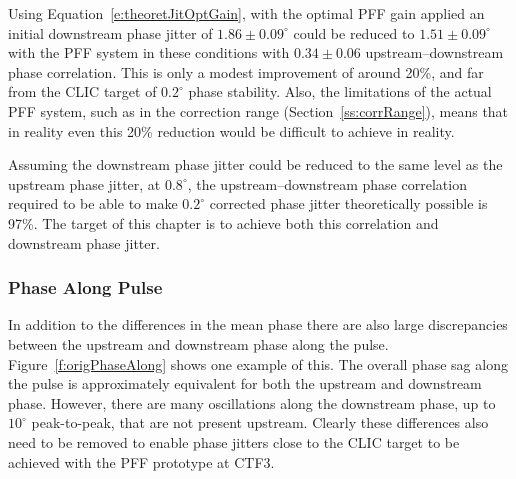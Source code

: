 Using Equation~\ref{e:theoretJitOptGain}, with the optimal PFF gain applied an initial downstream phase jitter of \(1.86\pm0.09^\circ\) could be reduced to \(1.51\pm0.09^\circ\) with the PFF system in these conditions with \(0.34\pm0.06\) upstream--downstream phase correlation. This is only a modest improvement of around 20\%, and far from the CLIC target of \(0.2^\circ\) phase stability. Also, the limitations of the actual PFF system, such as in the correction range (Section~\ref{ss:corrRange}), means that in reality even this 20\% reduction would be difficult to achieve in reality.

Assuming the downstream phase jitter could be reduced to the same level as the upstream phase jitter, at \(0.8^\circ\), the upstream--downstream phase correlation required to be able to make \(0.2^\circ\) corrected phase jitter theoretically possible is 97\%. The target of this chapter is to achieve both this correlation and downstream phase jitter.

\subsubsection{Phase Along Pulse}

In addition to the differences in the mean phase there are also large discrepancies between the upstream and downstream phase along the pulse. Figure~\ref{f:origPhaseAlong} shows one example of this. The overall phase sag along the pulse is approximately equivalent for both the upstream and downstream phase. However, there are many oscillations along the downstream phase, up to \(10^\circ\) peak-to-peak, that are not present upstream. Clearly these differences also need to be removed to enable phase jitters close to the CLIC target to be achieved with the PFF prototype at CTF3. 

